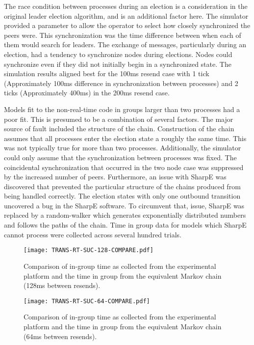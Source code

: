 The race condition between processes during an election is a consideration in the original leader election algorithm, and is an additional factor here.
The simulator provided a parameter to allow the operator to select how closely synchronized the peers were.
This synchronization was the time difference between when each of them would search for leaders.
The exchange of messages, particularly during an election, had a tendency to synchronize nodes during elections.
Nodes could synchronize even if they did not initially begin in a synchronized state. 
The simulation results aligned best for the 100ms resend case with 1 tick (Approximately 100ms difference in synchronization between processes) and 2 ticks (Approximately 400ms) in the 200ms resend case.

Models fit to the non-real-time code in groups larger than two processes had a poor fit.
This is presumed to be a combination of several factors.
The major source of fault included the structure of the chain. 
Construction of the chain assumes that all processes enter the election state a roughly the same time. 
This was not typically true for more than two processes.
Additionally, the simulator could only assume that the synchronization between processes was fixed.
The coincidental synchronization that occurred in the two node case was suppressed by the increased number of peers.
Furthermore, an issue with SharpE was discovered that prevented the particular structure of the chains produced from being handled correctly.
The election states with only one outbound transition uncovered a bug in the SharpE software.
To circumvent that, issue, SharpE was replaced by a random-walker which generates exponentially distributed numbers and follows the paths of the chain.
Time in group data for models which SharpE cannot process were collected across several hundred trials.

\begin{figure}
\centering
\begin{minipage}{0.45\textwidth}
    \centering
    \texttt{[image: TRANS-RT-SUC-128-COMPARE.pdf]}
    \caption{Comparison of in-group time as collected from the experimental platform and the time in group from the equivalent Markov chain (128ms between resends).}
    \label{fig:COMPARE-SUC-TRANS-RT-128}
\end{minipage}%
\qquad
\begin{minipage}{0.45\textwidth}
    \centering
    \texttt{[image: TRANS-RT-SUC-64-COMPARE.pdf]}
    \caption{Comparison of in-group time as collected from the experimental platform and the time in group from the equivalent Markov chain (64ms between resends).}
    \label{fig:COMPARE-SUC-TRANS-RT-64}
\end{minipage}
\end{figure}

